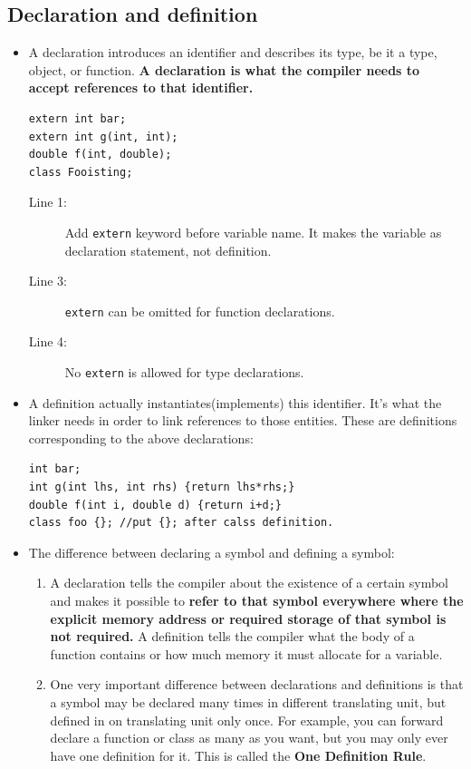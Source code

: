 \documentclass[a4paper,11pt,twoside]{book}
\begin{document}
\subsection{Declaration and definition}
\begin{itemize}
	\item A declaration introduces an identifier and describes its type, be it a type, object, or function. \textbf{A declaration is what the compiler needs to accept references to that identifier.} 
	
\begin{lstlisting}
extern int bar;
extern int g(int, int);
double f(int, double);
class Fooisting;
\end{lstlisting}

\begin{description}
	\item[Line 1:] Add \texttt{extern} keyword before variable name. It makes the variable as declaration statement, not definition.
	
	\item[Line 3:] \texttt{extern} can be omitted for function declarations.
	
	\item[Line 4:] No \texttt{extern} is allowed for type declarations.
\end{description}
	
	\item A definition actually instantiates(implements) this identifier. It's what the linker needs in order to link references to those entities. These are definitions corresponding to the above declarations:

\begin{lstlisting}[numbers=none]
int bar;
int g(int lhs, int rhs) {return lhs*rhs;}
double f(int i, double d) {return i+d;}
class foo {}; //put {}; after calss definition.
\end{lstlisting}
	
	\item The difference between declaring a symbol and defining a symbol:
	\begin{enumerate}
		\item A declaration tells the compiler about the existence of a certain symbol and makes it possible to \textbf{refer to that symbol everywhere where the explicit memory address or required storage of that symbol is not required.}  A definition tells the compiler what the body of a function contains or how much memory it must allocate for a variable.
		
		\item One very important difference between declarations and definitions is that a symbol may be declared many times in different translating unit, but defined in on translating unit only once. For example, you can forward declare a function or class as many as  you want, but you may only ever have one definition for it. This is called the \textbf{One Definition Rule}.
	\end{enumerate}

\end{itemize}
\end{document}
